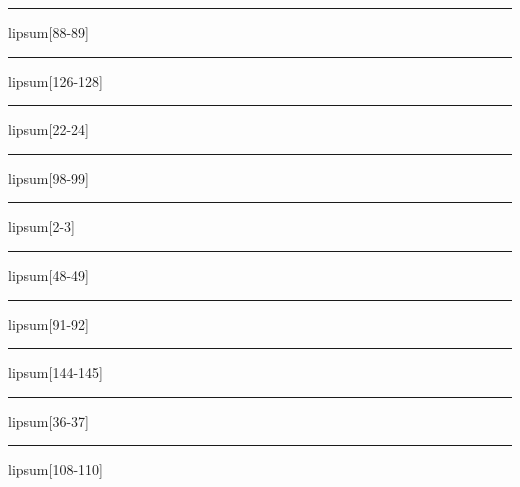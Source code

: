 \documentclass[11pt,a4paper]{article}
\begin{document}
\begin{simplewrap}
  \textcolor{lime!13}{\rule{3.3cm}{3.9cm}}
\end{simplewrap}
lipsum[88-89]

\begin{simplewrap}
  \textcolor{pink!59}{\rule{4.0cm}{7.1cm}}
\end{simplewrap}
lipsum[126-128]

\begin{simplewrap}
  \textcolor{magenta!34}{\rule{4.3cm}{7.4cm}}
\end{simplewrap}
lipsum[22-24]

\begin{simplewrap}
  \textcolor{violet!25}{\rule{5.1cm}{2.7cm}}
\end{simplewrap}
lipsum[98-99]

\begin{simplewrap}
  \textcolor{purple!57}{\rule{4.2cm}{4.9cm}}
\end{simplewrap}
lipsum[2-3]

\begin{simplewrap}
  \textcolor{blue!33}{\rule{5.3cm}{2.8cm}}
\end{simplewrap}
lipsum[48-49]

\begin{simplewrap}
  \textcolor{magenta!45}{\rule{4.5cm}{2.8cm}}
\end{simplewrap}
lipsum[91-92]

\begin{simplewrap}
  \textcolor{brown!34}{\rule{3.0cm}{5.3cm}}
\end{simplewrap}
lipsum[144-145]

\begin{simplewrap}
  \textcolor{magenta!46}{\rule{4.6cm}{7.5cm}}
\end{simplewrap}
lipsum[36-37]

\begin{simplewrap}
  \textcolor{teal!41}{\rule{3.4cm}{3.3cm}}
\end{simplewrap}
lipsum[108-110]
\end{document}
